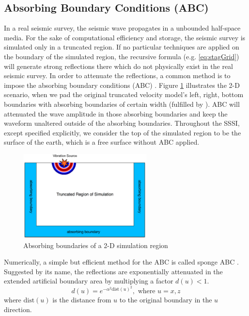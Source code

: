 \documentclass[11pt]{article}
\theoremstyle{plain}
\theoremstyle{definition}
\theoremstyle{remark}
\numberwithin{equation}{section}
\begin{document}
\subsection{Absorbing Boundary Conditions (ABC)}
In a real seismic survey, the seismic wave propagates in a unbounded half-space media. For the sake of computational efficiency and storage, the seismic survey is simulated only in a truncated region. If no particular techniques are applied on the boundary of the simulated region, the recursive formula (e.g. \eqref{eq:stagGrid}) will generate strong reflections there which do not physically exist in the real seismic survey. In order to attenuate the reflections, a common method is to impose the absorbing boundary conditions (ABC) \cite{Engquist:1977aa, Clayton:1977aa}. Figure \ref{fig:ABC} illustrates the 2-D scenario, when we pad the original truncated velocity model's left, right, bottom boundaries with absorbing boundaries of certain width (fulfilled by ). ABC will attenuated the wave amplitude in those absorbing boundaries and keep the waveform unaltered outside of the absorbing boundaries. Throughout the SSSI, except specified explicitly, we consider the top of the simulated region to be the surface of the earth, which is a free surface without ABC applied.

\begin{figure}[htbp]
\centering
\includegraphics[width=0.6\textwidth]{Fig/ABC}
\caption{Absorbing boundaries of a 2-D simulation region}
\label{fig:ABC}
\end{figure}

Numerically, a simple but efficient method for the ABC is called sponge ABC \cite{Cerjan:1985aa}. Suggested by its name, the reflections are exponentially attenuated in the extended artificial boundary area by multiplying a factor $d(u) < 1$.
\begin{equation}
d(u) = e^{-\alpha^2\text{dist}(u)^2}, \mbox{  where  } u=x, z
\end{equation}
where $\text{dist}(u)$ is the distance from $u$ to the original boundary in the $u$ direction. 
\end{document}
